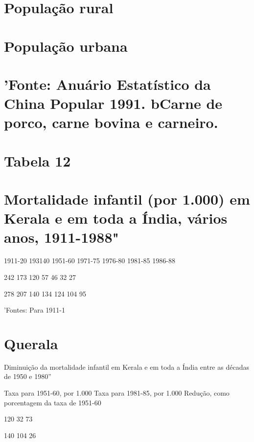 {{{\section{População rural}
 \par 
\section{População urbana}
 \par 
\section{'Fonte: Anuário Estatístico da China Popular 1991. bCarne de porco, carne bovina e carneiro.}
 \par 
\section{Tabela 12}
 \par 
\section{Mortalidade infantil (por 1.000) em Kerala e em toda a Índia, vários anos, 1911-1988"}
 \par 
1911-20 193140 1951-60 1971-75 1976-80 1981-85 1986-88
 \par 
242 {\color{blue}173} 120 {\color{blue}57} 46 {\color{blue}32} {\color{blue}27}
 \par 
278 {\color{blue}207} 140 {\color{blue}134} 124 {\color{blue}104} {\color{blue}95}
 \par 
'Fontes: Para 1911-1%
 \par 
\section{Querala}
 \par 
Diminuição da mortalidade infantil em Kerala e em toda a Índia entre as décadas de 1950 e 1980''
 \par 
Taxa para 1951-60, por {\color{blue}1}.{\color{blue}000} Taxa para 1981-85, por {\color{blue}1}.{\color{blue}000} Redução, como porcentagem da taxa de 1951-60
 \par 
120 {\color{blue}32} 73%
 \par 
140 {\color{blue}104} 26%
 \par 
}}}
